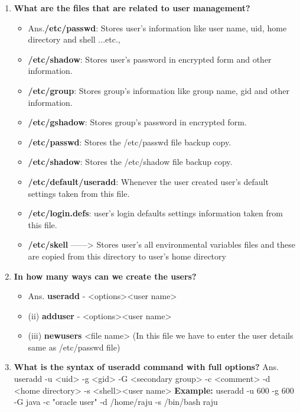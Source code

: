 \begin{enumerate}
    \bigskip
    \bigskip

    \item\textbf {What are the files that are related to user management?}
    \begin {itemize}
	    \item Ans.\textbf{/etc/passwd}: Stores user's information like user name, uid, home directory and shell ...etc.,
	    \item \textbf{/etc/shadow}: Stores user's password in encrypted form and other information.
	    \item \textbf{/etc/group}: Stores group's information like group name, gid and other information.
	    \item \textbf{/etc/gshadow}: Stores group's password in encrypted form.
	    \item \textbf{/etc/passwd}: Stores the  /etc/passwd   file backup copy.
	    \item \textbf{/etc/shadow}: Stores the /etc/shadow  file backup copy.
	    \item \textbf{/etc/default/useradd}: Whenever the user created user's default settings taken from this file.
	    \item \textbf{/etc/login.defs}: user's login defaults settings information taken from this file.
	    \item \textbf{/etc/skell}   ------> Stores user's all environmental variables files and these are copied from this directory to user's home directory
    \end{itemize}

    \bigskip
    \bigskip

    \item \textbf {In how many ways can we create the users?}
    \begin{itemize}
	    \item Ans. \textbf{useradd} - <options><user name>
	    \item (ii)  \textbf{adduser}    - <options><user name>
	    \item (iii) \textbf{newusers}    <file name>   (In this file we have to enter the user details same as /etc/passwd   file)
    \end{itemize}

    \bigskip
    \bigskip

    \item\textbf{What is the syntax of useradd command with full options?}
    \newline
     Ans. useradd  -u <uid>  -g <gid>  -G <secondary group> -c  <comment>  -d <home 
        directory> -s <shell><user name> 
        \newline
        \textbf{Example:} useradd  -u  600  -g  600  -G  java   -c  "oracle user"   -d  /home/raju   -s /bin/bash raju


\end{enumerate}
